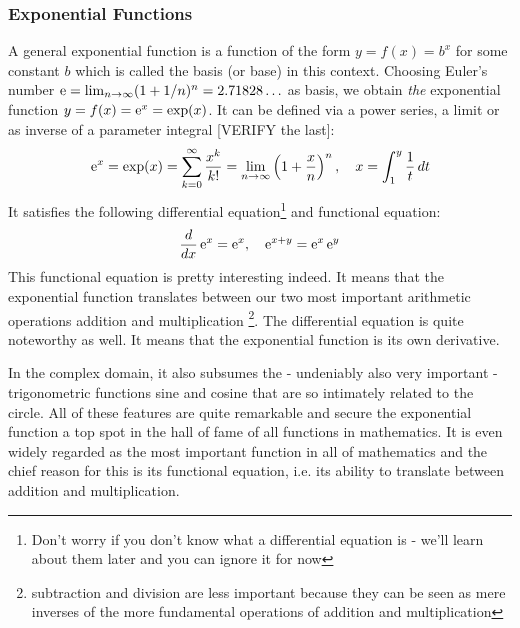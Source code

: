 \subsubsection{Exponential Functions}
A general exponential function is a function of the form $y = f(x) = b^x$ for some constant $b$ which is called the basis (or base) in this context. Choosing Euler's number $\operatorname{\mathrm{e}} = \lim_{n \rightarrow \infty} (1 + 1/n)^n = 2.71828\ldots$ as basis, we obtain \emph{the} exponential function $y = f(x) = \operatorname{\mathrm{e}}^x = \exp(x)$. It can be defined via a power series, a limit or as inverse of a parameter integral [VERIFY the last]:
\begin{equation}
\operatorname{\mathrm{e}}^x 
= \exp(x)
= \sum_{k=0}^{\infty} \frac{x^k}{k!}
= \lim_{n \rightarrow \infty} \left( 1 + \frac{x}{n} \right)^n, \quad
x = \int_1^y \frac{1}{t} \, dt
\end{equation}
It satisfies the following differential equation\footnote{Don't worry if you don't know what a differential equation is - we'll learn about them later and you can ignore it for now} and functional equation:
\begin{equation}
\frac{d}{dx} \operatorname{\mathrm{e}}^x = \operatorname{\mathrm{e}}^x, \quad
\operatorname{\mathrm{e}}^{x+y} = \operatorname{\mathrm{e}}^x \operatorname{\mathrm{e}}^y
\end{equation}
This functional equation is pretty interesting indeed. It means that the exponential function translates between our two most important arithmetic operations addition and multiplication \footnote{subtraction and division are less important because they can be seen as mere inverses of the more fundamental operations of addition and multiplication}. The differential equation is quite noteworthy as well. It means that the exponential function is its own derivative. 

In the complex domain, it also subsumes the - undeniably also very important - trigonometric functions sine and cosine that are so intimately related to the circle. All of these features are quite remarkable and secure the exponential function a top spot in the hall of fame of all functions in mathematics. It is even widely regarded as the most important function in all of mathematics and the chief reason for this is its functional equation, i.e. its ability to translate between addition and multiplication.


